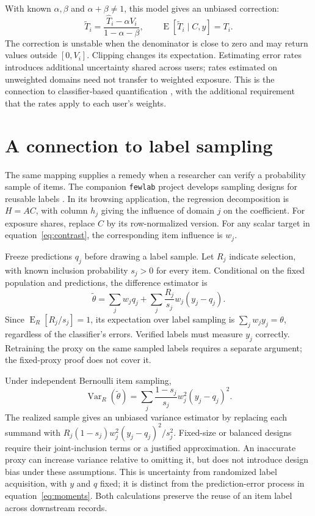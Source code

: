 \documentclass[11pt,letterpaper]{article}
\newcommand{\E}{\operatorname{E}}
\newcommand{\Var}{\operatorname{Var}}
\begin{document}
With known $\alpha,\beta$ and $\alpha+\beta\ne1$, this model gives an unbiased
correction:
\begin{equation}\label{eq:correction}
 \widetilde T_i=\frac{\widehat T_i-\alpha V_i}{1-\alpha-\beta},\qquad
 \E[\widetilde T_i\mid C,y]=T_i.
\end{equation}
The correction is unstable when the denominator is close to zero and may return
values outside $[0,V_i]$. Clipping changes its expectation. Estimating error
rates introduces additional uncertainty shared across users; rates estimated
on unweighted domains need not transfer to weighted exposure. This is the
connection to classifier-based quantification \citep{vaz2019quantification},
with the additional requirement that the rates apply to each user's weights.


\section{A connection to label sampling}
The same mapping supplies a remedy when a researcher can verify a probability
sample of items. The companion \texttt{fewlab} project develops sampling
designs for reusable labels \citep{sood2026fewlab}. In its browsing application,
the regression decomposition is $H=AC$, with column $h_j$ giving the influence
of domain $j$ on the coefficient. For exposure shares, replace $C$ by its
row-normalized version. For any scalar target in equation~\eqref{eq:contrast},
the corresponding item influence is $w_j$.

Freeze predictions $q_j$ before drawing a label sample. Let $R_j$ indicate
selection, with known inclusion probability $s_j>0$ for every item. Conditional
on the fixed population and predictions,
the difference estimator is
\begin{equation}\label{eq:difference}
 \widetilde\theta=\sum_j w_jq_j+
 \sum_j\frac{R_j}{s_j}w_j(y_j-q_j).
\end{equation}
Since $\E_R[R_j/s_j]=1$, its expectation over label sampling is
$\sum_jw_jy_j=\theta$, regardless of the classifier's errors. Verified labels
must measure $y_j$ correctly. Retraining the proxy on the same sampled labels
requires a separate argument; the fixed-proxy proof does not cover it.

Under independent Bernoulli item sampling,
\begin{equation}\label{eq:designvariance}
 \Var_R(\widetilde\theta)=
 \sum_j\frac{1-s_j}{s_j}w_j^2(y_j-q_j)^2.
\end{equation}
The realized sample gives an unbiased variance estimator by replacing each
summand with $R_j(1-s_j)w_j^2(y_j-q_j)^2/s_j^2$.
Fixed-size or balanced designs require their joint-inclusion terms or a
justified approximation. An inaccurate proxy can increase variance relative
to omitting it, but does not introduce design bias under these assumptions.
This is uncertainty from randomized label acquisition, with $y$ and $q$ fixed;
it is distinct from the prediction-error process in equation~\eqref{eq:moments}.
Both calculations preserve the reuse of an item label across downstream records.
\end{document}
